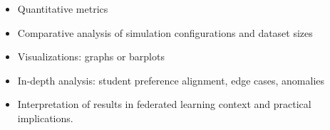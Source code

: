 \begin{itemize}
    \item Quantitative metrics
    \item Comparative analysis of simulation configurations and dataset sizes
    \item Visualizations: graphs or barplots
    \item In-depth analysis: student preference alignment, edge cases, anomalies
    \item Interpretation of results in federated learning context and practical implications.
\end{itemize}
